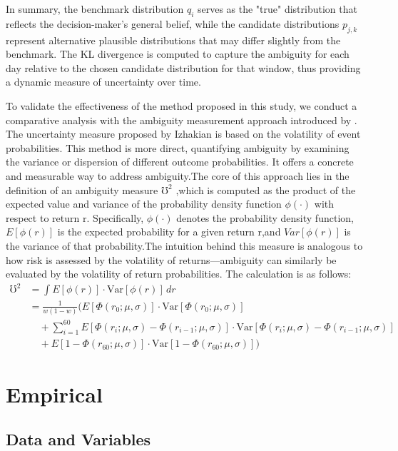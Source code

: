 \documentclass[preprint,12pt,authoryear]{elsarticle}
\begin{document}
In summary, the benchmark distribution \(q_i\) serves as the "true" distribution that reflects the decision-maker's general belief, while the candidate distributions \(p_{j,k}\) represent alternative plausible distributions that may differ slightly from the benchmark. The KL divergence is computed to capture the ambiguity for each day relative to the chosen candidate distribution for that window, thus providing a dynamic measure of uncertainty over time.

To validate the effectiveness of the method proposed in this study, we conduct a comparative analysis with the ambiguity measurement approach introduced by \cite{izhakian2020}. The uncertainty measure proposed by Izhakian is based on the volatility of event probabilities. This method is more direct, quantifying ambiguity by examining the variance or dispersion of different outcome probabilities. It offers a concrete and measurable way to address ambiguity.The core of this approach lies in the definition of an ambiguity measure $\mho^2$ ,which is computed as the product of the expected value and variance of the probability density function $\phi(\cdot)$ with respect to return r. Specifically, $\phi(\cdot)$
denotes the probability density function, $E[\phi(r)]$ is the expected probability for a given return r,and $Var[\phi(r)]$ is the variance of that probability.The intuition behind this measure is analogous to how risk is assessed by the volatility of returns—ambiguity can similarly be evaluated by the volatility of return probabilities. The calculation is as follows:
\begin{equation}
\begin{aligned}
\mho^2 &= \int E[\phi(r)] \cdot \text{Var}[\phi(r)] \, dr \\
       &= \frac{1}{w(1-w)} \bigg( E[\Phi(r_0;\mu,\sigma)] \cdot \text{Var}[\Phi(r_0;\mu,\sigma)] \\
       &\quad + \sum_{i=1}^{60} E[\Phi(r_i;\mu,\sigma) - \Phi(r_{i-1};\mu,\sigma)] \cdot \text{Var}[\Phi(r_i;\mu,\sigma) - \Phi(r_{i-1};\mu,\sigma)] \\
       &\quad + E[1-\Phi(r_{60};\mu,\sigma)] \cdot \text{Var}[1-\Phi(r_{60};\mu,\sigma)] \bigg)
\end{aligned}
\end{equation}



\section{Empirical}
\subsection{Data and Variables}
\end{document}

